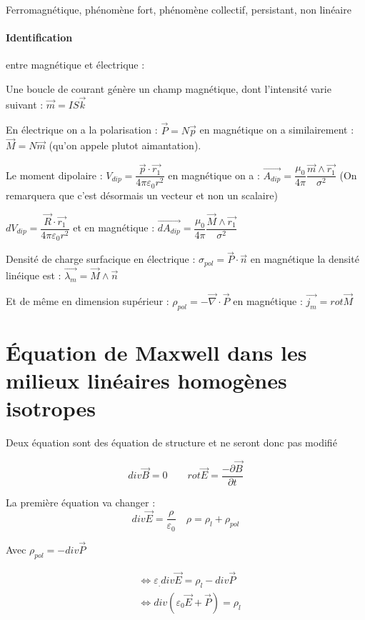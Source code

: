 \documentclass[12pt,a4paper]{report}
\begin{document}
Ferromagnétique, phénomène fort, phénomène collectif, persistant, non linéaire

\paragraph{Identification} entre magnétique et électrique : \par 

Une boucle de courant génère un champ magnétique, dont l'intensité varie suivant : \(\vec{m} = IS \vec{k}\)

En électrique on a la polarisation : \(\vec{P} = N \vec{p}\) en magnétique on a similairement : \(\vec{M} = N \vec{m}\) (qu'on appele plutot aimantation).

Le moment dipolaire : \(V_{dip} = \dfrac{\vec{p} \cdot \vec{r_1}}{4 \pi \varepsilon_0 r^2} \) en magnétique on a : \(\vec{A_{dip}} = \dfrac{\mu_0}{4\pi} \dfrac{\vec{m} \wedge \vec{r_1}}{\sigma^2}\) (On remarquera que c'est désormais un vecteur et non un scalaire)

\(dV_{dip} = \dfrac{\vec{R} \cdot \vec{r_1}}{4 \pi \varepsilon_0 r^2} \) et en magnétique : \(\vec{dA_{dip}} = \dfrac{\mu_0}{4\pi} \dfrac{\vec{M} \wedge \vec{r_1}}{\sigma^2}\)

Densité de charge surfacique en électrique : \(\sigma_{pol} = \vec{P} \cdot \vec{n}\) en magnétique la densité linéique est : \(\vec{\lambda_m} = \vec{M} \wedge \vec{n}\)

Et de même en dimension supérieur : \(\rho_{pol} = - \vec{\nabla} \cdot \vec{{P}}\) en magnétique : \(\vec{j_m} = rot \vec{M}\)

\section{Équation de Maxwell dans les milieux linéaires homogènes isotropes}

Deux équation sont des équation de structure et ne seront donc pas modifié

\[
	div \vec{B} = 0 \quad \quad rot \vec{E} = \dfrac{-\partial \vec{B}}{\partial t}
\]

La première équation va changer :
\[
	div \vec{E} = \dfrac{\rho}{\varepsilon_0} \quad \rho = \rho_l + \rho_{pol}
\]

Avec \(\rho_{pol} = - div \vec{P}\)

\begin{align*}
	&\Leftrightarrow \varepsilon_. div \vec{E} = \rho_l - div \vec{P}\\
	&\Leftrightarrow div (\varepsilon_0 \vec{E} + \vec{P}) = \rho_l
\end{align*}
\end{document}

